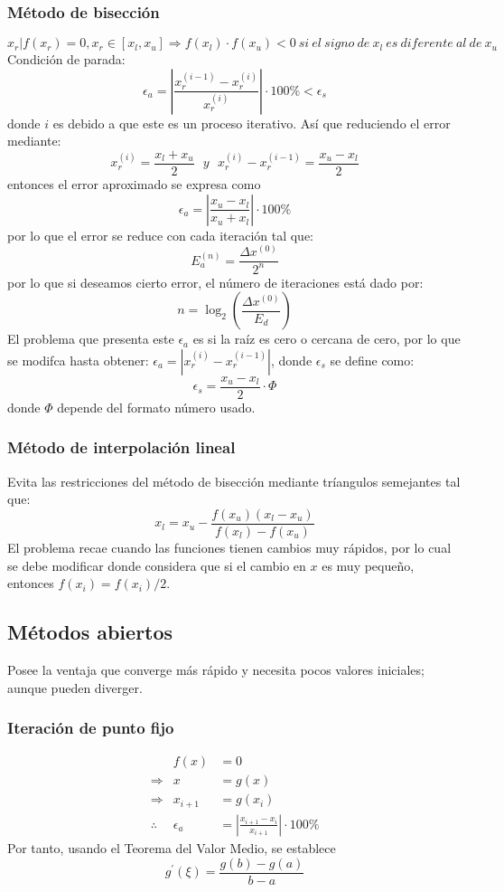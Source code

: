 \documentclass[letterpaper, 12pt, twoside]{article}
\begin{document}
	\subsubsection{Método de bisección}
	\begin{equation*}
	x_r | f(x_r) = 0, x_r \in [x_l, x_u] \Rightarrow f(x_l)\cdot f(x_u) < 0 ~si~el~signo~de~x_l~es~diferente~al~de~x_u
	\end{equation*}
	Condición de parada: $$\epsilon_a = \left|\frac{x_{r}^{(i-1)}-x_{r}^{(i)}}{x_{r}^{(i)}} \right|\cdot 100\si{\percent} < \epsilon_s$$ donde $i$ es debido a que este es un proceso iterativo. Así que reduciendo el error mediante: $$ x_r^{(i)} = \frac{x_l+x_u}{2} ~~~y~~~ x_r^{(i)}-x_r^{(i-1)} = \frac{x_u-x_l}{2}$$ entonces el error aproximado se expresa como $$ \epsilon_a = \left|\frac{x_u-x_l}{x_u+x_l}\right|\cdot 100\si{\percent} $$ por lo que el error se reduce con cada iteración  tal que: $$E_a^{(n)}=\frac{\Delta x^{(0)}}{2^n}$$ por lo que si deseamos cierto error, el número de iteraciones está dado por: $$n = \log_2\left(\frac{\Delta x^{(0)}}{E_d}\right)$$ El problema que presenta este $\epsilon_a$ es si la raíz es cero o cercana de cero, por lo que se modifca hasta obtener: $\epsilon_a = |x_r^{(i)}-x_r^{(i-1)}|$, donde $\epsilon_s$ se define como: $$\epsilon_s = \frac{x_u-x_l}{2}\cdot \Phi$$ donde $\Phi$ depende del formato número usado.
	\subsubsection{Método de interpolación lineal}
	Evita las restricciones del método de bisección mediante tríangulos semejantes tal que: $$x_l = x_u - \frac{f(x_u)(x_l-x_u)}{f(x_l)-f(x_u)}$$ El problema recae cuando las funciones tienen cambios muy rápidos, por lo cual se debe modificar donde considera que si el cambio en $x$ es muy pequeño, entonces $f(x_i)=f(x_i)/2$.
	\subsection{Métodos abiertos}
	Posee la ventaja que converge más rápido y necesita pocos valores iniciales; aunque pueden diverger.
	\subsubsection{Iteración de punto fijo}
	\begin{eqnarray*}
	&f(x) &= 0\\
	\Rightarrow &x &= g(x)\\
	\Rightarrow &x_{i+1} &=g(x_i)\\
	\therefore &\epsilon_a &= \left|\frac{x_{i+1}-x_i}{x_{i+1}}\right|\cdot 100\si{\percent}
	\end{eqnarray*}
	Por tanto, usando el Teorema del Valor Medio, se establece $$g^{\prime}(\xi)=\frac{g(b)-g(a)}{b-a}$$ 
	\bigskip
	
\end{document}
